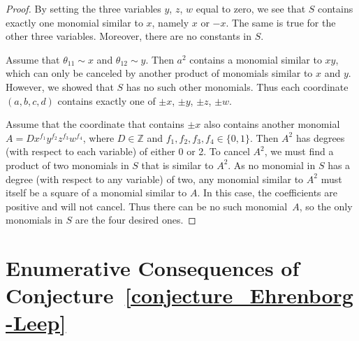 \documentclass[12pt,table]{article}
\theoremstyle{definition}
\theoremstyle{remark}
\newcommand{\Zzz}{\mathbb Z}
\numberwithin{equation}{section}
\begin{document}
\begin{proof}
By setting the three variables $y$, $z$, $w$ equal to zero, we see that $ S $ contains
exactly one monomial similar to $ x $, namely $ x$ or $ -x $. The same is true for
the other three variables. Moreover, there are no constants in $ S $.

Assume that $\theta_{11} \sim x$ and $\theta_{12} \sim y$.
Then $a^2$ contains
a monomial similar to $ xy $, which can only be canceled by another product of monomials similar to
$ x $ and $y$. However, we showed that $ S $ has no such other monomials.
Thus each coordinate $ (a, b, c, d) $ contains exactly one of $ \pm x$, $\pm y$, $\pm z$, $\pm w $.


Assume that the coordinate that contains $ \pm x $ also contains
another monomial $ A = Dx^{f_1}y^{f_2}z^{f_3}w^{f_4}$, where $ D \in \Zzz $
and $ f_1,f_2,f_3,f_4 \in \{0,1\} $. Then $ A^2 $ has degrees (with respect to
each variable) of either 0 or 2. To cancel $ A^2 $, we must find a product of two
monomials in $ S $ that is similar to $ A^2 $. As no monomial in $ S $ has a degree
(with respect to any variable) of two, any monomial similar to $ A^2 $ must itself be
a square of a monomial similar to $ A $. In this case, the coefficients are
positive and will not cancel. Thus there can be no such monomial~$ A $, so the only monomials
in $ S $ are the four desired ones.
\end{proof}

\section{Enumerative Consequences of Conjecture~\ref{conjecture_Ehrenborg-Leep}} 
\end{document}
